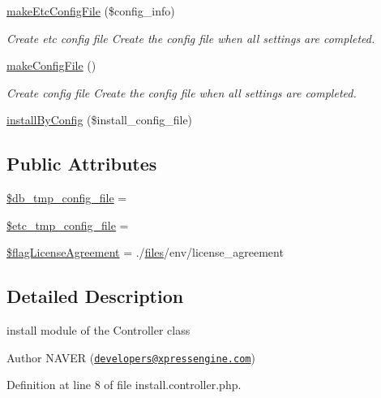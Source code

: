 \begin{DoxyCompactItemize}
\hyperlink{classinstallController_a87b331e263614e15c5366284648f6ee0}{make\+Etc\+Config\+File} (\$config\+\_\+info)
\begin{DoxyCompactList}\small\item\em Create etc config file Create the config file when all settings are completed. \end{DoxyCompactList}\item 
\hyperlink{classinstallController_a1ccad92dd450d67e90a2efdde0f6b78a}{make\+Config\+File} ()
\begin{DoxyCompactList}\small\item\em Create config file Create the config file when all settings are completed. \end{DoxyCompactList}\item 
\hyperlink{classinstallController_a4ec44b3090b73660ba018945c2ffa239}{install\+By\+Config} (\$install\+\_\+config\+\_\+file)
\end{DoxyCompactItemize}
\subsection*{Public Attributes}
\begin{DoxyCompactItemize}
\item 
\hyperlink{classinstallController_a1d32cf378279cb2b7d388b8a7e88c7aa}{\$db\+\_\+tmp\+\_\+config\+\_\+file} = \textquotesingle{}\textquotesingle{}
\item 
\hyperlink{classinstallController_a8e090f5c9a9844fbd8b4f0855a52dc43}{\$etc\+\_\+tmp\+\_\+config\+\_\+file} = \textquotesingle{}\textquotesingle{}
\item 
\hyperlink{classinstallController_af1f7a5fe91be6a576cdffcc07cba5be8}{\$flag\+License\+Agreement} = \textquotesingle{}./\hyperlink{popup_8min_8js_a0742cac2750bccc2d88ac080fb9daa22}{files}/env/license\+\_\+agreement\textquotesingle{}
\end{DoxyCompactItemize}


\subsection{Detailed Description}
install module of the Controller class 

\begin{DoxyAuthor}{Author}
N\+A\+V\+ER (\href{mailto:developers@xpressengine.com}{\tt developers@xpressengine.\+com}) 
\end{DoxyAuthor}


Definition at line 8 of file install.\+controller.\+php.



